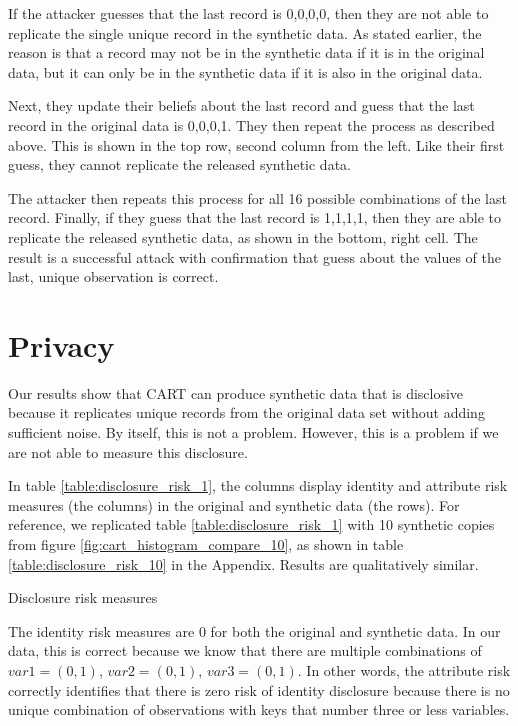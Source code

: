 \documentclass[runningheads]{llncs}
\begin{document}
If the attacker guesses that the last record is 0,0,0,0, then they are not able to replicate the single unique record in the synthetic data.  As stated earlier, the reason is that a record may not be in the synthetic data if it is in the original data, but it can only be in the synthetic data if it is also in the original data. 

Next, they update their beliefs about the last record and guess that the last record in the original data is 0,0,0,1.  They then repeat the process as described above.  This is shown in the top row, second column from the left.  Like their first guess, they cannot replicate the released synthetic data.  

The attacker then repeats this process for all 16 possible combinations of the last record.  Finally, if they guess that the last record is 1,1,1,1, then they are able to replicate the released synthetic data, as shown in the bottom, right cell.  The result is a successful attack with confirmation that guess about the values of the last, unique observation is correct.

\section{Privacy}

Our results show that CART can produce synthetic data that is disclosive because it replicates unique records from the original data set without adding sufficient noise.  By itself, this is not a problem.  However, this is a problem if we are not able to measure this disclosure.  

In table \ref{table:disclosure_risk_1}, the columns display identity and attribute risk measures (the columns) in the original and synthetic data (the rows).  For reference, we replicated table \ref{table:disclosure_risk_1} with 10 synthetic copies from figure \ref{fig:cart_histogram_compare_10}, as shown in table \ref{table:disclosure_risk_10} in the Appendix.  Results are qualitatively similar.  

\begin{table}[]
    \centering
    \caption{Disclosure risk measures}
    
    \label{table:disclosure_risk_1}
\end{table}

The identity risk measures are 0 for both the original and synthetic data.  In our data, this is correct because we know that there are multiple combinations of $var1=(0,1)$, $var2=(0,1)$, $var3=(0,1)$.  In other words, the attribute risk correctly identifies that there is zero risk of identity disclosure because there is no unique combination of observations with keys that number three or less variables.
\end{document}
